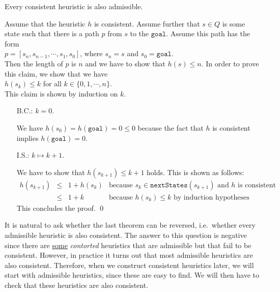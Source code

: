 \begin{Theorem}
  Every consistent heuristic is also admissible.
\end{Theorem}

\proof
Assume that the heuristic $h$ is consistent.  Assume further that $s \in Q$ is some state such that there is a
path $p$ from $s$ to the $\mathtt{goal}$.  Assume this path has the form
\\[0.2cm]
\hspace*{1.3cm}
$p = [s_n, s_{n-1}, \cdots, s_1, s_0]$, \quad where $s_n = s$ and $s_0 = \mathtt{goal}$.
\\[0.2cm]
Then the length of $p$ is $n$ and we have to show that $h(s) \leq n$.  In order to prove this claim, we show
that we have
\\[0.2cm]
\hspace*{1.3cm}
$h(s_k) \leq k$ \quad for all $k \in \{0, 1, \cdots, n\}$.
\\[0.2cm]
This claim is shown by induction on $k$.
\begin{enumerate}
\item[B.C.:] $k=0$.

             We have $h(s_0) = h(\mathtt{goal}) = 0 \leq 0$ because the fact that $h$ is consistent implies
             $h(\mathtt{goal}) = 0$.
\item[I.S.:] $k \mapsto k+1$.

             We have to show that $h(s_{k+1}) \leq k + 1$ holds.  This is shown as follows:
             \\[0.2cm]
             \hspace*{1.3cm}
             $
             \begin{array}{lcll}
               h(s_{k+1}) & \leq & 1 + h(s_k) & \mbox{because $s_k \in \mathtt{nextStates}(s_{k+1})$ and $h$ is consistent} \\[0.2cm]
                         & \leq & 1 + k      & \mbox{because $h(s_k) \leq k$ by induction hypotheses}
             \end{array}
             $
             \\[0.2cm]
             This concludes the proof.  \qed
\end{enumerate}

It is natural to ask whether the last theorem can be reversed, i.e.~whether every admissible heuristic is also
consistent.  The answer to this question is negative since there are
\href{http://web.cs.du.edu/~sturtevant/papers/incnew.pdf}{some} \emph{\color{red}contorted}
heuristics that are admissible but that fail to be consistent.  However, in practice it turns out that most
admissible heuristics are also consistent.  Therefore, when we construct consistent heuristics later, we will
start with admissible heuristics, since these are easy to find.  We will then have to check that these
heuristics are also consistent.

